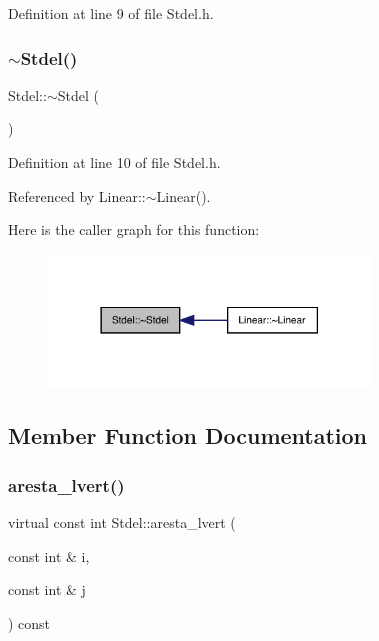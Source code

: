 Definition at line 9 of file Stdel.\+h.

\mbox{\label{classStdel_adaf008b25928d7953a68572e1ab7f6ef}} 
\subsubsection{\texorpdfstring{$\sim$\+Stdel()}{~Stdel()}}
{\footnotesize\ttfamily Stdel\+::$\sim$\+Stdel (\begin{DoxyParamCaption}{ }\end{DoxyParamCaption})\hspace{0.3cm}{\ttfamily [inline]}}



Definition at line 10 of file Stdel.\+h.



Referenced by Linear\+::$\sim$\+Linear().

Here is the caller graph for this function\+:
\nopagebreak
\begin{figure}[H]
\begin{center}
\leavevmode
\includegraphics[width=242pt]{classStdel_adaf008b25928d7953a68572e1ab7f6ef_icgraph}
\end{center}
\end{figure}


\subsection{Member Function Documentation}
\mbox{\label{classStdel_a69b8ef7def7891fcb2d5d8fd9b75bdc8}} 
\subsubsection{\texorpdfstring{aresta\+\_\+lvert()}{aresta\_lvert()}}
{\footnotesize\ttfamily virtual const int Stdel\+::aresta\+\_\+lvert (\begin{DoxyParamCaption}\item[{const int \&}]{i,  }\item[{const int \&}]{j }\end{DoxyParamCaption}) const\hspace{0.3cm}{\ttfamily [pure virtual]}}



